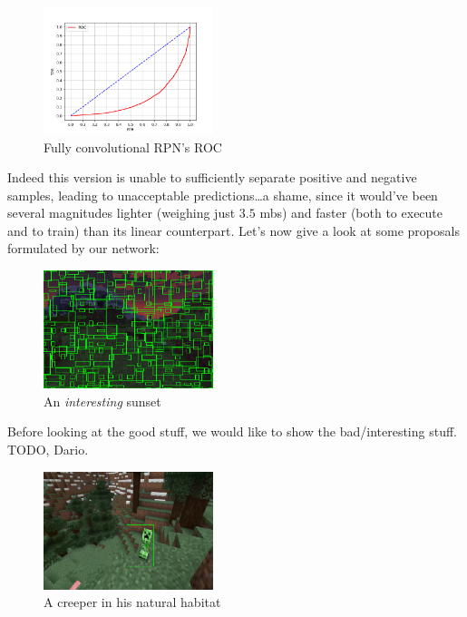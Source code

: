 \documentclass[10pt,journal,cspaper,compsoc]{IEEEtran}
\begin{document}
    \begin{figure}[h]
        \centering
        \includegraphics[width=0.44\textwidth]{images/ROC_conv.png}
        \caption{Fully convolutional RPN's ROC}
    \end{figure}

    Indeed this version is unable to sufficiently separate positive and negative samples, leading to unacceptable predictions\dots a shame, since it would've been several magnitudes lighter (weighing just $3.5$ mbs) and faster (both to execute and to train) than its linear counterpart.
    \newpage
    Let's now give a look at some proposals formulated by our network:

    \begin{figure}[h]
        \centering
        \includegraphics[width=0.44\textwidth]{images/sunset.png}
        \caption{An \emph{interesting} sunset}
    \end{figure}

    Before looking at the good stuff, we would like to show the bad/interesting stuff.  TODO, Dario.

    \begin{figure}[h]
        \centering
        \includegraphics[width=0.44\textwidth]{images/nice_creeper.png}
        \caption{A creeper in his natural habitat}
    \end{figure}
\end{document}
